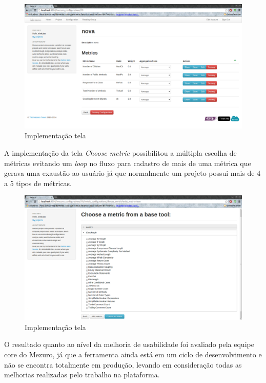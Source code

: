 \graphicspath{{figuras/}}
\begin{figure}[H]
\centering
\includegraphics[width=1.0\textwidth]{configuration}
\caption{Implementação tela}
\label{parallel-coordinate}
\end{figure}

A implementação da tela \textit{Choose metric} possibilitou a múltipla escolha de métricas evitando um \textit{loop} no fluxo para cadastro de mais de uma métrica que gerava uma exaustão ao usuário já que normalmente um projeto possui mais de 4 a 5 tipos de métricas.

\graphicspath{{figuras/}}
\begin{figure}[H]
\centering
\includegraphics[width=1.0\textwidth]{select_metrics}
\caption{Implementação tela}
\label{parallel-coordinate}
\end{figure}

O resultado quanto ao nível da melhoria de usabilidade foi avaliado pela equipe core do Mezuro, já que a ferramenta ainda está em um ciclo de desenvolvimento e não se encontra totalmente em produção, levando em consideração todas as melhorias realizadas pelo trabalho na plataforma.

